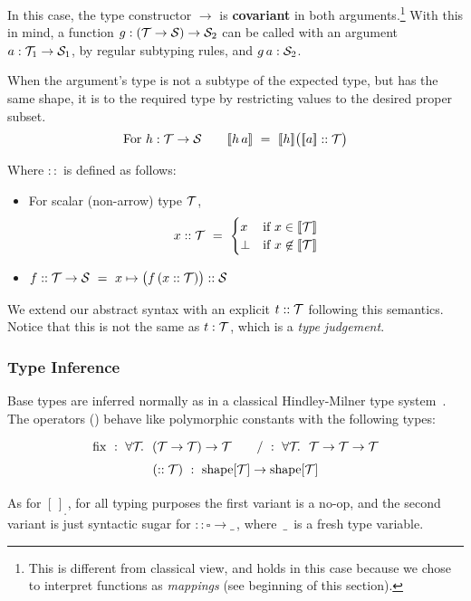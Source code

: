 In this case, the type constructor $\to$ is {\bf covariant} in both arguments.\footnote{This is different from classical view, and holds in this case because we chose to interpret functions as \emph{mappings} (see beginning of this section).}
With this in mind, a function $g:(\T\to\S)\to \S_2$ can be called with an argument $a: \T_1\to\S_1$,
by regular subtyping rules, and $g\,a : \S_2$.

When the argument's type is not a subtype of the expected type, but has the same shape,
it is  to the required type by restricting values to the desired proper subset.
%
\[\mbox{For }h:\T\to\S \qquad \semp{h\,a} ~=~ \semp{h}\big(\semp{a} :: \T\big)\]

Where $::$ is defined as follows:
\begin{itemize}
  \item For scalar (non-arrow) type $\T$, \[x :: \T ~=~ \begin{cases}x & \mbox{if }x\in\semp{\T} \\ \bot & \mbox{if }x\not\in\semp{\T}\end{cases}\]
  \item $f :: \T\to\S ~=~ x\mapsto \big(f\,(x :: \T)\big) :: \S$
\end{itemize}

\medskip
We extend our abstract syntax with an explicit 
$t::\T$ following this semantics. Notice that this is not the same as $t:\T$, which is a \emph{type judgement}.

\subsubsection*{Type Inference}

Base types are inferred normally as in a classical Hindley-Milner type system~\cite{78/Milner}.
The operators () behave like polymorphic
constants with the following types:
\[\renewcommand\arraystretch{1.5}
  \begin{array}{c}
    {\fix} ~:~ \forallT ~(\T\to\T)\to\T \qquad 
    {/} ~:~ \forallT ~\T\to\T\to\T \\
    (::\T) ~:~ \mathrm{shape}[\T]\to\mathrm{shape}[\T]
  \end{array}\]

As for $[\,]_{_\square}$, for all typing purposes the first variant is a no-op, and the second variant
is just syntactic sugar for $:: \square\to\_$\,,
where \,$\_$\, is a fresh type variable.

